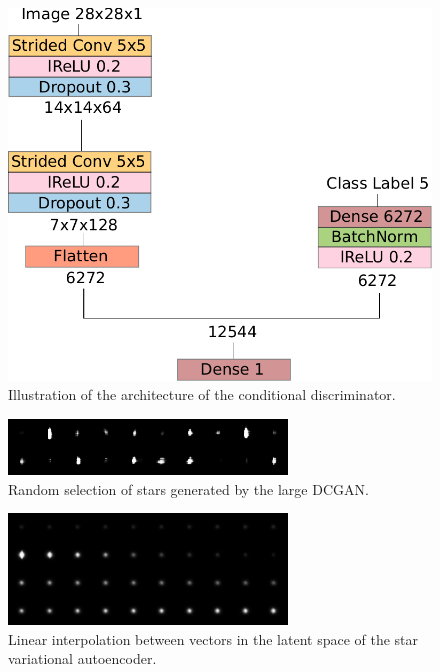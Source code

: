\documentclass[10pt,conference,compsocconf]{IEEEtran}
\begin{document}
\begin{figure}
    \centering
    \includegraphics[width=0.75\columnwidth]{assets/cdis_arch.pdf}
    \caption{Illustration of the architecture of the conditional discriminator.}
    \label{fig:cdis_arch}
\end{figure}


\begin{figure}
    \centering
    \includegraphics[width=\columnwidth]{assets/star_ensemble_large.png}
    \caption{Random selection of stars generated by the large DCGAN.}
    \label{fig:dcgan_stars}
\end{figure}

\begin{figure}
    \centering
    \includegraphics[width=\columnwidth]{assets/vae_interpolation.png}
    \caption{Linear interpolation between vectors in the latent space of the star variational autoencoder.}
    \label{fig:vae_interpolation}
\end{figure}
\end{document}
